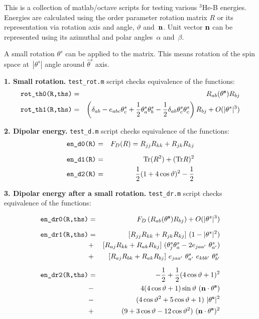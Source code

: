\documentclass[a4paper]{article}
\def\ts{\theta^s}
\def\ct{\cos\vartheta}
\def\st{\sin\vartheta}
\begin{document}
This is a collection of matlab/octave scripts for testing various $^3$He-B
energies. Energies are calculated using the order parameter rotation matrix $R$ or its
representation via rotation axis and angle, $\vartheta$ and~$\bf n$. Unit vector $\bf n$
can be represented using its azimuthal and polar angles~$\alpha$ and~$\beta$.

A small rotation $\ts$ can be applied to the matrix. This means rotation of the spin space
at~$|\ts|$ angle around $\hat\ts$ axis.

{\bf 1. Small rotation.}
{\tt test\_rot.m} script checks equivalence of the functions:
\begin{eqnarray*}
\mbox{\tt rot\_th0(R,ths)} &=& R_{ab}({\bf \ts}) R_{bj}\\
\mbox{\tt rot\_th1(R,ths)} &=& 
\left(\delta_{ab} - e_{abc}\ts_c + \frac12 \ts_a \ts_b
 - \frac12 \delta_{ab}\ts_c \ts_c
\right) R_{bj} + O(|\ts|^3)
\end{eqnarray*}

{\bf 2. Dipolar energy.}
{\tt test\_d.m} script checks equivalence of the functions:
\begin{eqnarray*}
\mbox{\tt en\_d0(R)} &=& F_D(R) = R_{jj}R_{kk} + R_{jk}R_{kj}\\[2mm]
\mbox{\tt en\_d1(R)} &=& \mbox{Tr} (R^2) + (\mbox{Tr} R)^2\\
\mbox{\tt en\_d2(R)} &=& \frac12 (1 + 4\ct)^2 - \frac12
\end{eqnarray*}

{\bf 3. Dipolar energy after a small rotation.}
{\tt test\_dr.m} script checks equivalence of the functions:

\begin{eqnarray*}
\mbox{\tt en\_dr0(R,ths)} &=&
F_D\left(R_{ab}({\bf \ts}) R_{bj}\right) + O(|\ts|^3)\\[2mm]
\mbox{\tt en\_dr1(R,ths)} &=&
[ R_{jj} R_{kk} + R_{jk}R_{kj} ]\ (1-|\ts|^2)\\
&+& [R_{aj} R_{kk} + R_{ak} R_{kj}]\ (\ts_j \ts_a - 2e_{ja a'}\ \ts_{a'}) \\
&+& [R_{aj} R_{bk} + R_{ak} R_{bj}]\ e_{jaa'}\ \ts_{a'}\ e_{kbb'}\ \ts_{b'}
\\[2mm]
\mbox{\tt en\_dr2(R,ths)} &=&
 - \frac12 + \frac12 (4\ct+1)^2\\
 &-& 4(4\ct+1)\st\ ({\bf n}\cdot{\bf\ts})\\
 &-& (4\ct^2+5\ct+1)\ |{\bf\ts}|^2\\
 &+& (9 + 3\ct - 12\ct^2)\ ({\bf n}\cdot{\bf\ts})^2
\end{eqnarray*}
\end{document}
